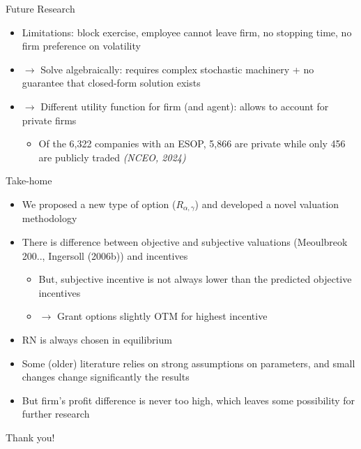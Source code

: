 \documentclass{beamer}
\begin{document}
\begin{frame}{Future Research}
    \begin{itemize}
        \item Limitations: block exercise, employee cannot leave firm, no stopping time, no firm preference on volatility
        \item $\rightarrow$ Solve algebraically: requires complex stochastic machinery + no guarantee that closed-form solution exists
        \item $\rightarrow$ Different utility function for firm (and agent): allows to account for private firms
        \begin{itemize}
            \item Of the 6,322 companies with an ESOP, 5,866 are private while only 456 are publicly traded \textit{(NCEO, 2024)}
        \end{itemize}
    \end{itemize}
\end{frame}

\begin{frame}{Take-home}
    \begin{itemize}
        \item We proposed a new type of option ($R_{\alpha, \gamma}$) and developed a novel valuation methodology
        \item There is difference between objective and subjective valuations (Meoulbreok 200.., Ingersoll (2006b)) and incentives
        \begin{itemize}
            \item But, subjective incentive is not always lower than the predicted objective incentives
            \item $\rightarrow$ Grant options slightly OTM for highest incentive
        \end{itemize}
        \item RN is always chosen in equilibrium
        \item Some (older) literature relies on strong assumptions on parameters, and small changes change significantly the results
        \item But firm's profit difference is never too high, which leaves some possibility for further research
    \end{itemize}
\end{frame}


\begin{frame}{}
    \begin{center}
        \Huge Thank you!
    \end{center}
\end{frame}





\end{document}
